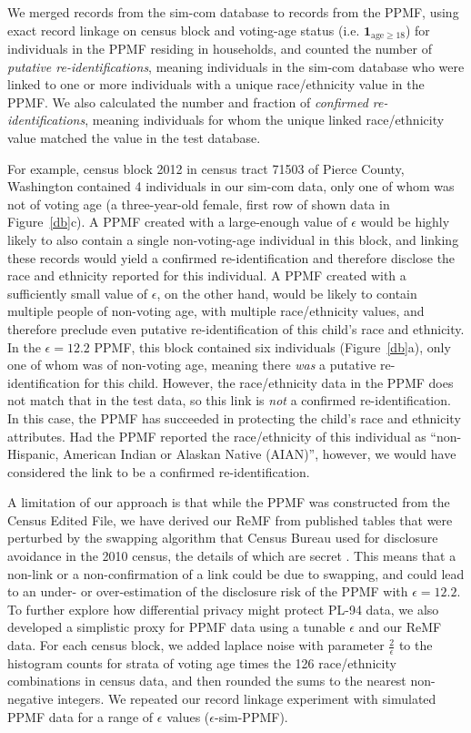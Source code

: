\documentclass{article}
\begin{document}
We merged records from the sim-com database to records from the PPMF, using exact record linkage on census block and voting-age status (i.e. $\mathbf{1}_{\mathrm{age} \geq 18}$) for individuals in the PPMF residing in households, and counted the number of \emph{putative re-identifications}, meaning individuals in the sim-com database who were linked to one or more individuals with a unique race/ethnicity value in the PPMF.  We also calculated the number and fraction of \emph{confirmed re-identifications}, meaning individuals for whom the unique linked race/ethnicity value matched the value in the test database.

For example, census block 2012 in census tract 71503 of Pierce County, Washington contained 4 individuals in our sim-com data, only one of whom was not of voting age (a three-year-old female, first row of shown data in Figure~\ref{db}c).  A PPMF created with a large-enough value of $\epsilon$ would be highly likely to also contain a single non-voting-age individual in this block, and linking these records would yield a confirmed re-identification and therefore disclose the race and ethnicity reported for this individual. A PPMF created with a sufficiently small value of $\epsilon$, on the other hand, would be likely to contain multiple people of non-voting age, with multiple race/ethnicity values, and therefore preclude even putative re-identification of this child's race and ethnicity. In the $\epsilon=12.2$ PPMF, this block contained six individuals (Figure~\ref{db}a), only one of whom was of non-voting age, meaning there \emph{was} a putative re-identification for this child. However, the race/ethnicity data in the PPMF does not match that in the test data, so this link is \emph{not} a confirmed re-identification. In this case, the PPMF has succeeded in protecting the child's race and ethnicity attributes.  Had the PPMF reported the race/ethnicity of this individual as ``non-Hispanic, American Indian or Alaskan Native (AIAN)'', however, we would have considered the link to be a confirmed re-identification.

A limitation of our approach is that while the PPMF was constructed from the Census Edited File, we have derived our ReMF from published tables that were perturbed by the swapping algorithm that Census Bureau used for disclosure avoidance in the 2010 census, the details of which are secret \cite{mckenna2018disclosure}.   This means that a non-link or a non-confirmation of a link could be due to swapping, and could lead to an under- or over-estimation of the disclosure risk of the PPMF with $\epsilon=12.2$.  To further explore how differential privacy might protect PL-94 data, we also developed a simplistic proxy for PPMF data using a tunable $\epsilon$ and our ReMF data.  For each census block, we added laplace noise with parameter $\frac{2}{\epsilon}$ to the histogram counts for strata of voting age times the 126 race/ethnicity combinations in census data, and then rounded the sums to the nearest non-negative integers.  We repeated our record linkage experiment with simulated PPMF data for a range of $\epsilon$ values ($\epsilon$-sim-PPMF).
\end{document}
